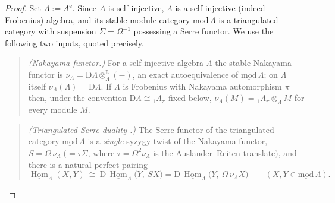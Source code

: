 \documentclass[11pt]{amsart}
\theoremstyle{definition}
\newcommand{\D}{\mathrm{D}}
\newcommand{\sHom}{\underline{\operatorname{Hom}}}
\newcommand{\Ae}{A^{\mathrm{e}}}
\newcommand{\Lotimes}{\otimes^{\mathbf{L}}}
\begin{document}
\begin{proof}
Set $\Lambda:=\Ae$. Since $A$ is self-injective, $\Lambda$ is a self-injective
(indeed Frobenius) algebra, and its stable module category
$\underline{\mathrm{mod}}\,\Lambda$ is a triangulated category with suspension
$\Sigma=\Omega^{-1}$ possessing a Serre functor. We use the following two
inputs, quoted precisely.

\begin{quote}
\emph{(Nakayama functor.)} For a self-injective algebra $\Lambda$ the stable
Nakayama functor is $\nu_\Lambda=\D\Lambda\Lotimes_\Lambda(-)$, an exact
autoequivalence of $\underline{\mathrm{mod}}\,\Lambda$; on $\Lambda$ itself
$\nu_\Lambda(\Lambda)=\D\Lambda$. If $\Lambda$ is Frobenius with Nakayama
automorphism $\pi$ then, under the convention $\D\Lambda\cong{}_1\Lambda_\pi$
fixed below, $\nu_\Lambda(M)={}_1\Lambda_\pi\otimes_\Lambda M$ for every module
$M$.
\end{quote}

\begin{quote}
\emph{(Triangulated Serre duality \cite[Ch.~IV]{ARS}.)} The Serre functor of
the triangulated category $\underline{\mathrm{mod}}\,\Lambda$ is a
\emph{single} syzygy twist of the Nakayama functor,
$S=\Omega\,\nu_\Lambda\;(=\tau\Sigma$, where $\tau=\Omega^2\nu_\Lambda$ is the
Auslander--Reiten translate$)$, and there is a natural perfect pairing
\[
\sHom_\Lambda(X,Y)\ \cong\ \D\,\sHom_\Lambda\bigl(Y,\ SX\bigr)
=\D\,\sHom_\Lambda\bigl(Y,\ \Omega\,\nu_\Lambda X\bigr)
\qquad(X,Y\in\underline{\mathrm{mod}}\,\Lambda).
\]
\end{quote}


\end{proof}
\end{document}
